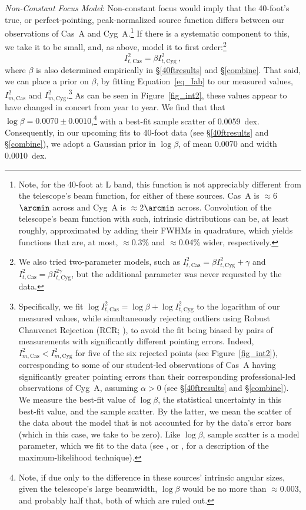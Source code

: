 \documentclass[fleqn,usenatbib]{mnras}
\newcommand{\Imcyg}{\mbox{$I^2_{m,\mathrm{Cyg}}$}}
\newcommand{\Itcyg}{\mbox{$I^2_{t,\mathrm{Cyg}}$}}
\newcommand{\Imcas}{\mbox{$I^2_{m,\mathrm{Cas}}$}}
\newcommand{\Itcas}{\mbox{$I^2_{t,\mathrm{Cas}}$}}
\begin{document}
\noindent
\textit{Non-Constant Focus Model}:
Non-constant focus would imply that the 40-foot's true, or perfect-pointing, peak-normalized source function differs between our observations of Cas~A and Cyg~A.\footnote{Note, for the 40-foot at L band, this function is not appreciably different from the telescope's beam function, for either of these sources.  Cas~A is $\approx$6$\arcmin$ across and Cyg~A is $\approx$2$\arcmin$ across.  Convolution of the telescope's beam function with such, intrinsic distributions can be, at least roughly, approximated by adding their FWHMs in quadrature, which yields functions that are, at most, $\approx$0.3\% and $\approx$0.04\% wider, respectively.}  If there is a systematic component to this, we take it to be small, and, as above, model it to first order:\footnote{We also tried two-parameter models, such as $\Itcas=\beta\Itcyg+\gamma$ and $\Itcas=\beta I_{t,\mathrm{Cyg}}^{2\gamma}$, but the additional parameter was never requested by the data.}
\begin{equation}\label{eq_Iab}
\Itcas=\beta\Itcyg \, ,
\end{equation} 
where $\beta$ is also determined empirically in \S\ref{40ftresults} and \S\ref{combine}.  That said, we can place a prior on $\beta$, by fitting Equation~\ref{eq_Iab} to our measured values, $\Imcas$ and $\Imcyg$.\footnote{Specifically, we fit $\log\Itcas = \log\beta + \log\Itcyg$ to the logarithm of our measured values, while simultaneously rejecting outliers using Robust Chauvenet Rejection (RCR; \citealt{m17}), to avoid the fit being biased by pairs of measurements with significantly different pointing errors.  Indeed, $\Imcas < \Imcyg$ for five of the six rejected points (see Figure~\ref{fig_int2}), corresponding to some of our student-led observations of Cas~A having significantly greater pointing errors than their corresponding professional-led observations of Cyg~A, assuming $\alpha>0$ (see \S\ref{40ftresults} and \S\ref{combine}).  We measure the best-fit value of $\log\beta$, the statistical uncertainty in this best-fit value, and the sample scatter.  By the latter, we mean the scatter of the data about the model that is not accounted for by the data's error bars (which in this case, we take to be zero).  Like $\log\beta$, sample scatter is a model parameter, which we fit to the data (see \citealt{t11}, or \citealt{r01}, for a description of the maximum-likelihood technique).}  As can be seen in Figure~\ref{fig_int2}, these values appear to have changed in concert from year to year.  We find that that $\log\beta = 0.0070 \pm 0.0010$,\footnote{Note, if due only to the difference in these sources' intrinsic angular sizes, given the telescope's large beamwidth, $\log\beta$ would be no more than $\approx$0.003, and probably half that, both of which are ruled out.} with a best-fit sample scatter of 0.0059~dex.  Consequently, in our upcoming fits to 40-foot data (see \S\ref{40ftresults} and \S\ref{combine}), we adopt a Gaussian prior in $\log\beta$, of mean 0.0070 and width 0.0010~dex.   
\end{document}
